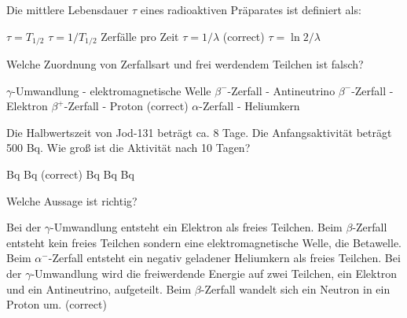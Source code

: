 \documentclass[11pt]{exam}
\begin{document}
\setlength{\voffset}{-0.5in}
\setlength{\headsep}{5pt}

\hspace{2mm}
 \hspace{5mm}
\vspace{4mm}

\begin{questions}

\question Die mittlere Lebensdauer \( \tau \) eines radioaktiven Präparates ist definiert als:

\begin{choices}
	\choice \( \tau = T_{1/2} \)
	\choice \( \tau = 1/T_{1/2} \)
	\choice Zerfälle pro Zeit
	\choice \( \tau = 1/\lambda \) (correct)
	\choice \( \tau = \ln 2 / \lambda \)
\end{choices}

\vspace{3mm}\question Welche Zuordnung von Zerfallsart und frei werdendem Teilchen ist falsch?

\begin{choices}
	\choice \( \gamma \)-Umwandlung - elektromagnetische Welle
	\choice \( \beta^- \)-Zerfall - Antineutrino
	\choice \( \beta^- \)-Zerfall - Elektron
	\choice \( \beta^+ \)-Zerfall - Proton (correct)
	\choice \( \alpha \)-Zerfall - Heliumkern
\end{choices}

\vspace{3mm}\question Die Halbwertszeit von Jod-131 beträgt ca. 8 Tage. Die Anfangsaktivität beträgt 500 Bq. Wie groß ist die Aktivität nach 10 Tagen?

\begin{choices}
	 Bq
	 Bq (correct)
	 Bq
	 Bq
	 Bq
\end{choices}

\vspace{3mm}\question Welche Aussage ist richtig?

\begin{choices}
	\choice Bei der \( \gamma \)-Umwandlung entsteht ein Elektron als freies Teilchen.
	\choice Beim \( \beta \)-Zerfall entsteht kein freies Teilchen sondern eine elektromagnetische Welle, die Betawelle.
	\choice Beim \( \alpha^- \)-Zerfall entsteht ein negativ geladener Heliumkern als freies Teilchen.
	\choice Bei der \( \gamma \)-Umwandlung wird die freiwerdende Energie auf zwei Teilchen, ein Elektron und ein Antineutrino, aufgeteilt.
	\choice Beim \( \beta \)-Zerfall wandelt sich ein Neutron in ein Proton um. (correct)
\end{choices}


\end{questions}
\end{document}
